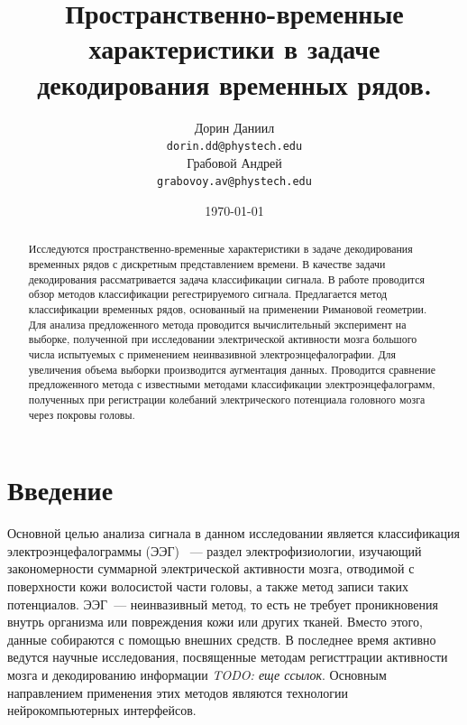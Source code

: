 \documentclass[a4paper, 12pt]{extarticle}
\title{Пространственно-временные характеристики в задаче декодирования временных рядов.}
\author{
	Дорин Даниил \\
	\texttt{dorin.dd@phystech.edu} \\
	\And
	Грабовой Андрей \\
	\texttt{grabovoy.av@phystech.edu}
}
\date{\today}
\begin{document}
\maketitle

\begin{abstract}

	Исследуются пространственно-временные характеристики в задаче декодирования временных рядов с дискретным представлением времени.
	В качестве задачи декодирования рассматривается задача классификации сигнала. 
	В работе проводится обзор методов классификации регестрируемого сигнала. 
	Предлагается метод классификации временных рядов, основанный на применении Римановой геометрии. 
	Для анализа предложенного метода проводится вычислительный эксперимент на выборке, 
	полученной при исследовании электрической активности мозга большого числа испытуемых с применением неинвазивной электроэнцефалографии. 
	Для увеличения объема выборки производится аугментация данных. 
	Проводится сравнение предложенного метода с известными методами классификации электроэнцефалограмм, полученных при регистрации колебаний электрического 
	потенциала головного мозга через покровы головы.

\end{abstract}


\section{Введение}

\indent Основной целью анализа сигнала в данном исследовании является 
классификация электроэнцефалограммы (ЭЭГ) \citep{teplan2002fundamentals, beniczky2020electroencephalography}~--- раздел электрофизиологии, 
изучающий закономерности суммарной электрической активности мозга, 
отводимой с поверхности кожи волосистой части головы, 
а также метод записи таких потенциалов. ЭЭГ~--- неинвазивный метод, то есть 
не требует проникновения внутрь организма или повреждения кожи или других тканей. 
Вместо этого, данные собираются с помощью внешних средств. 
В последнее время активно ведутся научные исследования, 
посвященные методам регисттрации активности мозга и декодированию 
информации \citep{siuly2016eeg} \textit{TODO: еще ссылок}. Основным направлением применения 
этих методов являются технологии нейрокомпьютерных интерфейсов.
\end{document}
